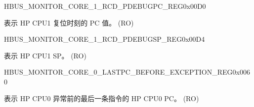 \begin{register}{H}{BUS\_MONITOR\_CORE\_1\_RCD\_PDEBUGPC\_REG}{0x00D0}\label{regdesc:BUSMONITORCORE1RCDPDEBUGPCREG}
%
\regnewline%
\begin{regdesc}\begin{reglist}
\label{fielddesc:BUSMONITORCORE1RCDPDEBUGPC}\item [BUS\_MONITOR\_CORE\_1\_RCD\_PDEBUGPC] 表示 HP CPU1 复位时刻的 PC 值。 (RO)
\end{reglist}\end{regdesc}
\end{register}


\begin{register}{H}{BUS\_MONITOR\_CORE\_1\_RCD\_PDEBUGSP\_REG}{0x00D4}\label{regdesc:BUSMONITORCORE1RCDPDEBUGSPREG}
%
\regnewline%
\begin{regdesc}\begin{reglist}
\label{fielddesc:BUSMONITORCORE1RCDPDEBUGSP}\item [BUS\_MONITOR\_CORE\_1\_RCD\_PDEBUGSP] 表示 HP CPU1 SP。 (RO)
\end{reglist}\end{regdesc}
\end{register}




\begin{register}{H}{BUS\_MONITOR\_CORE\_0\_LASTPC\_BEFORE\_EXCEPTION\_REG}{0x0060}\label{regdesc:BUSMONITORCORE0LASTPCBEFOREEXCEPTIONREG}
%
\regnewline%
\begin{regdesc}\begin{reglist}
\label{fielddesc:BUSMONITORCORE0LASTPCBEFOREEXC}\item [BUS\_MONITOR\_CORE\_0\_LASTPC\_BEFORE\_EXC] 表示 HP CPU0 异常前的最后一条指令的 HP CPU0 PC。 (RO)
\end{reglist}\end{regdesc}
\end{register}


